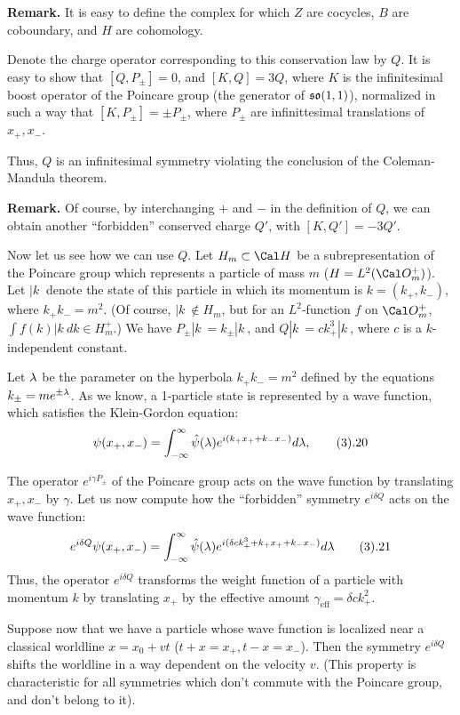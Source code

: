 {\bf Remark.} It is easy to define the complex for which $Z$ are cocycles,
$B$ are coboundary, and $H$ are cohomology. 

Denote the charge operator corresponding to this conservation law by $Q$. 
It is easy to show that $[Q,P_\pm]=0$, and $[K,Q]=3Q$, where
$K$ is the infinitesimal boost operator of the Poincare group (the 
generator of $\frak{so}(1,1)$), normalized in such a way that 
$[K,P_\pm]=\pm P_{\pm}$, where $P_\pm$ are infinittesimal translations of 
$x_+,x_-$. 

Thus, $Q$ is an infinitesimal symmetry violating the 
conclusion of the Coleman-Mandula 
theorem.

{\bf Remark.} Of course, by interchanging $+$ and $-$ in the definition of 
$Q$, we can obtain another ``forbidden'' conserved charge $Q'$,
with $[K,Q']=-3Q'$.  

Now let us see how we can use $Q$. Let $H_m\subset \Cal H$ be a 
subrepresentation of the Poincare group which represents a particle
of mass $m$ ($H=L^2(\O_m^+)$). Let $|k\>$ denote the state of this particle 
in which its momentum is $k=(k_+,k_-)$, where $k_+k_-=m^2$. (Of course, 
$|k\>\notin H_m$, but for an $L^2$-function $f$ on $\O_m^+$, 
$\int f(k)|k\>dk\in H_m^+$.) We have $P_\pm |k\>=k_\pm|k\>$, and 
$Q|k\>=ck_+^3|k\>$, where $c$ is a $k$-independent constant. 

Let $\lambda$ be the parameter on the hyperbola $k_+k_-=m^2$ defined by the 
equations $k_\pm=me^{\pm \lambda}$.  
As we know, a 1-particle state is represented by a wave function,
which satisfies the Klein-Gordon equation:
$$
\psi(x_+,x_-)=\int_{-\infty}^{\infty}\hat\psi(\l)e^{i(k_+x_++k_-x_-)}d\l,
\tag 3.20
$$

The operator $e^{i\gamma P_\pm}$ 
of the Poincare group acts on the wave function by translating 
$x_+,x_-$ by $\gamma$. 
Let us now compute how the ``forbidden'' symmetry $e^{i\delta Q}$ 
acts on the wave function:
$$
e^{i\delta Q}\psi(x_+,x_-)=
\int_{-\infty}^{\infty}\hat\psi(\l)e^{i(\delta ck_+^3+k_+x_++k_-x_-)}d\l\tag 3.21
$$
Thus, the operator $e^{i\delta Q}$ transforms the weight function of a particle
with momentum $k$ by translating $x_+$ by the effective amount 
$\gamma_{\text{eff}}=\delta c k_+^2$. 

Suppose now that we have a particle whose wave function is localized near 
a classical worldline $x=x_0+vt$ ($t+x=x_+,t-x=x_-$). Then the symmetry 
$e^{i\delta Q}$ shifts the worldline in a way dependent on the velocity $v$. 
(This property is characteristic for all symmetries which don't commute 
with the Poincare group, and don't belong to it).

